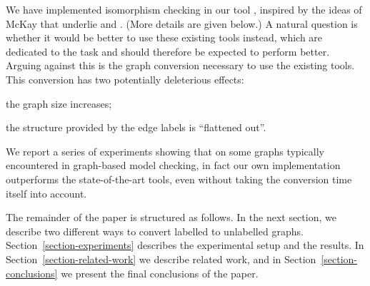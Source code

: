 We have implemented isomorphism checking in our tool \GROOVE
\cite{rensink2009:groove}, inspired by the ideas of McKay
\cite{mckay1981:practical} that underlie \NAUTY and \BLISS. (More details are
given below.) A natural question is whether it would be better to use these
existing tools instead, which are dedicated to the task and should therefore be
expected to perform better. Arguing against this is the graph conversion
necessary to use the existing tools. This conversion has two potentially
deleterious effects:
%
\begin{inparaenum}
\item the graph size increases;
\item the structure provided by the edge labels is ``flattened out''.
\end{inparaenum}
%
We report a series of experiments showing that on some graphs typically
encountered in graph-based model checking, in fact our own implementation
outperforms the state-of-the-art tools, even without taking the conversion time
itself into account.

\medskip\noindent The remainder of the paper is structured as follows. In the
next section, we describe two different ways to convert labelled to unlabelled
graphs. Section~\ref{section-experiments} describes the experimental setup and
the results. In Section~\ref{section-related-work} we describe related work,
and in Section~\ref{section-conclusions} we present the final conclusions of
the paper.
